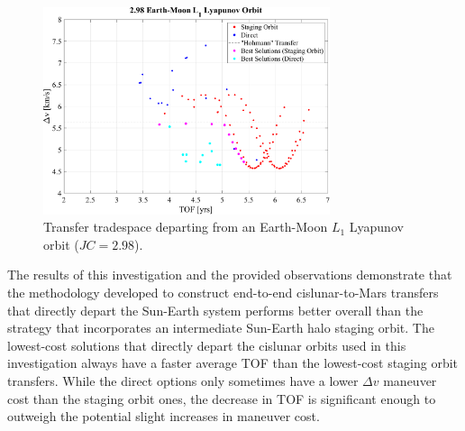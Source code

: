 \begin{figure}[ht]
    \centering
    \includegraphics[width=0.75\textwidth]{figures/TradeSpace_L1Lyapunov_2_98.pdf}
    \caption{Transfer tradespace departing from an Earth-Moon $L_{1}$ Lyapunov orbit ($JC=2.98$).}
    \label{fig:fewDirect}
\end{figure}

The results of this investigation and the provided observations demonstrate that the methodology
developed to construct end-to-end cislunar-to-Mars transfers that directly depart the Sun-Earth
system performs better overall than the strategy that incorporates an intermediate Sun-Earth halo
staging orbit. The lowest-cost solutions that directly depart the cislunar orbits used in this
investigation always have a faster average TOF than the lowest-cost staging orbit transfers. While
the direct options only sometimes have a lower $\Delta v$ maneuver cost than the staging orbit
ones, the decrease in TOF is significant enough to outweigh the potential slight increases in
maneuver cost.
